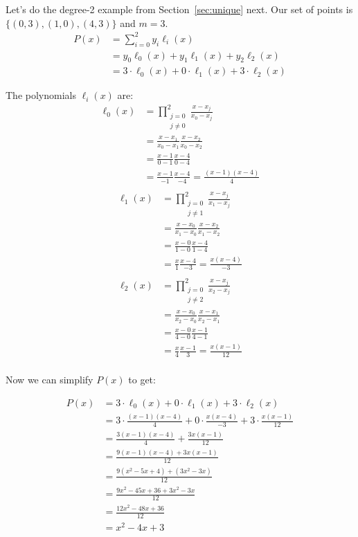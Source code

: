 \begin{example}\label{ex:lagrange2}
Let's do the degree-2 example from Section~\ref{sec:unique} next. Our set of 
points is $\{(0,3),(1,0),(4,3)\}$ and $m=3$.
\begin{align*}
    P(x) &= \sum_{i=0}^{2} y_i \ell_i(x)\\
    &= y_0 \ell_0(x) + y_1 \ell_1(x) + y_2 \ell_2(x)\\
    &= 3 \cdot \ell_0(x) + 0 \cdot \ell_1(x) + 3 \cdot \ell_2(x)
\end{align*}

The polynomials $\ell_i(x)$ are:
\begin{align*}
    \ell_0(x) &= \prod_{\substack{j=0\\j\neq 0}}^{2} \frac{x-x_j}{x_0-x_j}\\
    &= \frac{x-x_1}{x_0-x_1} \frac{x-x_2}{x_0-x_2}\\
    &= \frac{x-1}{0-1} \frac{x-4}{0-4}\\
    &= \frac{x-1}{-1} \frac{x-4}{-4}
    = \frac{(x-1)(x-4)}{4}\\
\end{align*}
\begin{align*}
    \ell_1(x) &= \prod_{\substack{j=0\\j\neq 1}}^{2} \frac{x-x_j}{x_1-x_j}\\
    &= \frac{x-x_0}{x_1-x_0} \frac{x-x_2}{x_1-x_2}\\
    &= \frac{x-0}{1-0} \frac{x-4}{1-4}\\
    &= \frac{x}{1} \frac{x-4}{-3}
    = \frac{x(x-4)}{-3}\\
\end{align*}
\begin{align*}
    \ell_2(x) &= \prod_{\substack{j=0\\j\neq 2}}^{2} \frac{x-x_j}{x_2-x_j}\\
    &= \frac{x-x_0}{x_2-x_0} \frac{x-x_1}{x_2-x_1}\\
    &= \frac{x-0}{4-0} \frac{x-1}{4-1}\\
    &= \frac{x}{4} \frac{x-1}{3}
    = \frac{x(x-1)}{12}\\
\end{align*}

Now we can simplify $P(x)$ to get:

\begin{align*}
    P(x) &= 3 \cdot \ell_0(x) + 0 \cdot \ell_1(x) + 3 \cdot \ell_2(x)\\
    &= 3 \cdot \frac{(x-1)(x-4)}{4} + 0 \cdot \frac{x(x-4)}{-3} + 3 \cdot \frac{x(x-1)}{12}\\
    &= \frac{3(x-1)(x-4)}{4} + \frac{3x(x-1)}{12}\\
    &= \frac{9(x-1)(x-4) + 3x(x-1)}{12}\\
    &= \frac{9(x^2-5x+4) + (3x^2-3x)}{12}\\
    &= \frac{9x^2-45x+36 + 3x^2-3x}{12}\\
    &= \frac{12x^2-48x+36}{12}\\
    &= x^2-4x+3
\end{align*}


\end{example}

